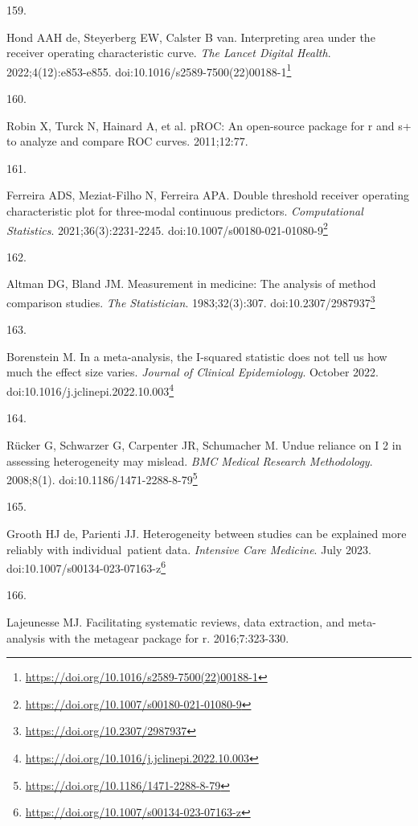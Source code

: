 \documentclass[
  a4paper,
]{book}
\newlength{\cslhangindent}
\newlength{\csllabelwidth}
\newlength{\cslentryspacingunit} %
\newenvironment{CSLReferences}[2] %
 {%
  \setlength{\parindent}{0pt}
  \ifodd #1
  \let\oldpar\par
  \def\par{\hangindent=\cslhangindent\oldpar}
  \fi
  \setlength{\parskip}{#2\cslentryspacingunit}
 }%
 {}
\newcommand{\CSLLeftMargin}[1]{\parbox[t]{\csllabelwidth}{#1}}
\newcommand{\CSLRightInline}[1]{\parbox[t]{\linewidth - \csllabelwidth}{#1}\break}
\renewcommand{\href}[2]{#2\footnote{\url{#1}}}
\begin{document}
\begin{CSLReferences}{0}{0}
\leavevmode{}%
\CSLLeftMargin{159. }%
\CSLRightInline{Hond AAH de, Steyerberg EW, Calster B van. Interpreting area under the receiver operating characteristic curve. \emph{The Lancet Digital Health}. 2022;4(12):e853-e855. doi:\href{https://doi.org/10.1016/s2589-7500(22)00188-1}{10.1016/s2589-7500(22)00188-1}}

\leavevmode{}%
\CSLLeftMargin{160. }%
\CSLRightInline{Robin X, Turck N, Hainard A, et al. pROC: An open-source package for r and s+ to analyze and compare ROC curves. 2011;12:77.}

\leavevmode{}%
\CSLLeftMargin{161. }%
\CSLRightInline{Ferreira ADS, Meziat-Filho N, Ferreira APA. Double threshold receiver operating characteristic plot for three-modal continuous predictors. \emph{Computational Statistics}. 2021;36(3):2231-2245. doi:\href{https://doi.org/10.1007/s00180-021-01080-9}{10.1007/s00180-021-01080-9}}

\leavevmode{}%
\CSLLeftMargin{162. }%
\CSLRightInline{Altman DG, Bland JM. Measurement in medicine: The analysis of method comparison studies. \emph{The Statistician}. 1983;32(3):307. doi:\href{https://doi.org/10.2307/2987937}{10.2307/2987937}}

\leavevmode{}%
\CSLLeftMargin{163. }%
\CSLRightInline{Borenstein M. In a meta-analysis, the I-squared statistic does not tell us how much the effect size varies. \emph{Journal of Clinical Epidemiology}. October 2022. doi:\href{https://doi.org/10.1016/j.jclinepi.2022.10.003}{10.1016/j.jclinepi.2022.10.003}}

\leavevmode{}%
\CSLLeftMargin{164. }%
\CSLRightInline{Rücker G, Schwarzer G, Carpenter JR, Schumacher M. Undue reliance on I 2 in assessing heterogeneity may mislead. \emph{BMC Medical Research Methodology}. 2008;8(1). doi:\href{https://doi.org/10.1186/1471-2288-8-79}{10.1186/1471-2288-8-79}}

\leavevmode{}%
\CSLLeftMargin{165. }%
\CSLRightInline{Grooth HJ de, Parienti JJ. Heterogeneity between studies can be explained more reliably with individual~patient data. \emph{Intensive Care Medicine}. July 2023. doi:\href{https://doi.org/10.1007/s00134-023-07163-z}{10.1007/s00134-023-07163-z}}

\leavevmode{}%
\CSLLeftMargin{166. }%
\CSLRightInline{Lajeunesse MJ. Facilitating systematic reviews, data extraction, and meta-analysis with the metagear package for r. 2016;7:323-330.}


\end{CSLReferences}
\end{document}
